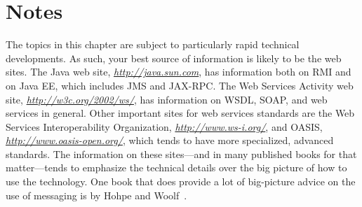 \section*{Notes}
The topics in this chapter are subject to particularly rapid technical
developments.  As such, your best source of information is likely to
be the web sites.  The Java web site, \textit{\url{http://java.sun.com}}, has
information both on RMI and on Java EE, which includes JMS and JAX-RPC.
The Web Services Activity web site, \textit{\url{http://w3c.org/2002/ws/}}, has
information on WSDL, SOAP, and web services in general.  Other
important sites for web services standards are the Web Services
Interoperability Organization, \textit{\url{http://www.ws-i.org/}}, and OASIS,
\textit{\url{http://www.oasis-open.org/}}, which tends to have more specialized,
advanced standards.  The information on these sites---and in many
published books for that matter---tends to emphasize the technical
details over the big picture of how to use the technology.  One book
that does provide a lot of big-picture advice on the use of messaging
is by Hohpe and Woolf~\cite{max1157}.

